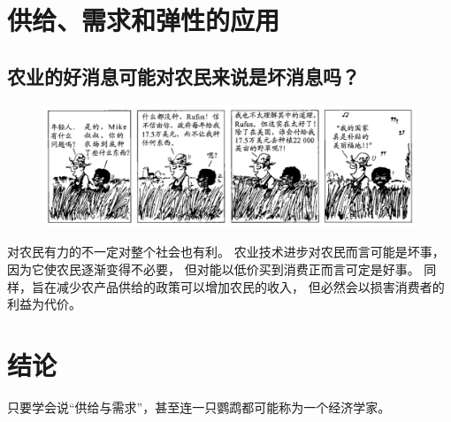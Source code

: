 \section{供给、需求和弹性的应用}

\subsection{农业的好消息可能对农民来说是坏消息吗？}

\begin{figure}[!ht]
  \centering
  \includegraphics[width=\textwidth]{pics/farmer}
\end{figure}


对农民有力的不一定对整个社会也有利。
农业技术进步对农民而言可能是坏事，
因为它使农民逐渐变得不必要，
但对能以低价买到消费正而言可定是好事。
同样，旨在减少农产品供给的政策可以增加农民的收入，
但必然会以损害消费者的利益为代价。


\section{结论}

只要学会说“供给与需求”，甚至连一只鹦鹉都可能称为一个经济学家。